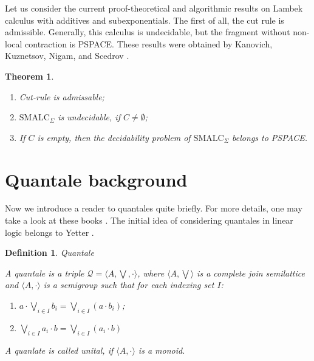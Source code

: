 \documentclass[a4paper]{article}
\theoremstyle{defin}
\newtheorem{defin}{Definition}
\theoremstyle{theorem}
\newtheorem{theorem}{Theorem}
\theoremstyle{prop}
\theoremstyle{lemma}
\theoremstyle{ex}
\theoremstyle{col}
\begin{document}
  \vspace{\baselineskip}

Let us consider the current proof-theoretical and algorithmic results on Lambek calculus with additives and subexponentials.
The first of all, the cut rule is admissible. Generally, this calculus is undecidable, but the fragment without non-local
contraction is PSPACE. These results were obtained by Kanovich, Kuznetsov, Nigam, and Scedrov \cite{Sc}.

\begin{theorem}
$ $

  \begin{enumerate}
    \item Cut-rule is admissable;
    \item $\text{SMALC}_{\Sigma}$ is undecidable, if $C \neq \emptyset$;
    \item If $C$ is empty, then the decidability problem of $\text{SMALC}_{\Sigma}$ belongs to PSPACE.
  \end{enumerate}
\end{theorem}

\section{Quantale background}

Now we introduce a reader to quantales quite briefly. For more details, one may take a look at these books \cite{Quantale18}
\cite{Rosenthal}. The initial idea of considering quantales in linear logic belongs to Yetter \cite{Yetter}.

\begin{defin} Quantale
$ $

  A quantale is a triple $\mathcal{Q} = \langle A, \bigvee, \cdot \rangle$, where $\langle A, \bigvee \rangle$
is a complete join semilattice and $\langle A, \cdot \rangle$ is a semigroup such that for each indexing set $I$:

\begin{enumerate}
  \item $a \cdot \bigvee \limits_{i \in I} b_i = \bigvee \limits_{i \in I} (a \cdot b_i)$;
  \item $\bigvee \limits_{i \in I} a_i \cdot b = \bigvee \limits_{i \in I} (a_i \cdot b)$
\end{enumerate}

A quanlate is called unital, if $\langle A, \cdot \rangle$ is a monoid.
\end{defin}
\end{document}
